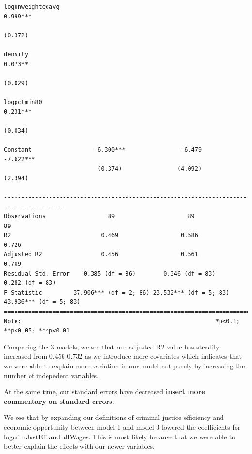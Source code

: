 \documentclass[]{article}
\begin{document}
\begin{verbatim}
logunweightedavg                                                         0.999***       
                                                                         (0.372)        
                                                                                        
density                                                                  0.073**        
                                                                         (0.029)        
                                                                                        
logpctmin80                                                              0.231***       
                                                                         (0.034)        
                                                                                        
Constant                  -6.300***                -6.479               -7.622***       
                           (0.374)                (4.092)                (2.394)        
                                                                                        
----------------------------------------------------------------------------------------
Observations                  89                     89                     89          
R2                          0.469                  0.586                  0.726         
Adjusted R2                 0.456                  0.561                  0.709         
Residual Std. Error    0.385 (df = 86)        0.346 (df = 83)        0.282 (df = 83)    
F Statistic         37.906*** (df = 2; 86) 23.532*** (df = 5; 83) 43.936*** (df = 5; 83)
========================================================================================
Note:                                                        *p<0.1; **p<0.05; ***p<0.01
\end{verbatim}

Comparing the 3 models, we see that our adjusted R2 value has steadily
increased from 0.456-0.732 as we introduce more covariates which
indicates that we were able to explain more variation in our model not
purely by increasing the number of indepedent variables.

At the same time, our standard errors have decreased \textbf{insert more
commentary on standard errors}.

We see that by expanding our definitions of criminal justice efficiency
and economic opportunity between model 1 and model 3 lowered the
coefficients for logcrimJustEff and allWages. This is most likely
because that we were able to better explain the effects with our newer
variables.
\end{document}
